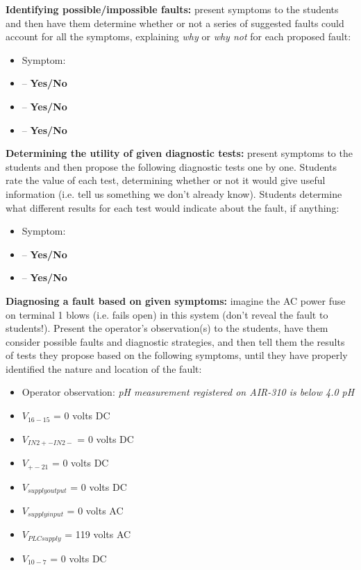 \vskip 10pt


\noindent
{\bf Identifying possible/impossible faults:} present symptoms to the students and then have them determine whether or not a series of suggested faults could account for all the symptoms, explaining {\it why} or {\it why not} for each proposed fault:

\begin{itemize}
\item{} Symptom: {\it }
\item{}  -- {\bf Yes/No}
\item{}  -- {\bf Yes/No}
\item{}  -- {\bf Yes/No}
\end{itemize}


\vskip 10pt


\noindent
{\bf Determining the utility of given diagnostic tests:} present symptoms to the students and then propose the following diagnostic tests one by one.  Students rate the value of each test, determining whether or not it would give useful information (i.e. tell us something we don't already know).  Students determine what different results for each test would indicate about the fault, if anything:

\begin{itemize}
\item{} Symptom: {\it }
\item{}  -- {\bf Yes/No}
\item{}  -- {\bf Yes/No}
\end{itemize}


\vskip 10pt


\noindent
{\bf Diagnosing a fault based on given symptoms:} imagine the AC power fuse on terminal 1 blows (i.e. fails open) in this system (don't reveal the fault to students!).  Present the operator's observation(s) to the students, have them consider possible faults and diagnostic strategies, and then tell them the results of tests they propose based on the following symptoms, until they have properly identified the nature and location of the fault:

\begin{itemize}
\item{} Operator observation: {\it pH measurement registered on AIR-310 is below 4.0 pH}
\item{} $V_{16-15}$ = 0 volts DC
\item{} $V_{IN2+-IN2-}$ = 0 volts DC
\item{} $V_{+-21}$ = 0 volts DC
\item{} $V_{supply output}$ = 0 volts DC
\item{} $V_{supply input}$ = 0 volts AC
\item{} $V_{PLC supply}$ = 119 volts AC
\item{} $V_{10-7}$ = 0 volts DC
\end{itemize}




